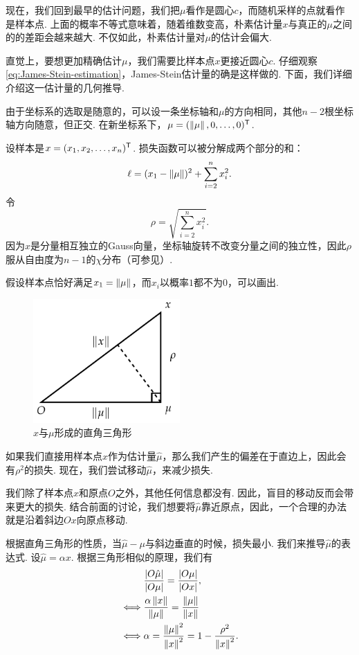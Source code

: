 现在，我们回到最早的估计问题，我们把$\mu$看作是圆心$c$，而随机采样的点就看作是样本点. 上面的概率不等式意味着，随着维数变高，朴素估计量$x$与真正的$\mu$之间的的差距会越来越大. 不仅如此，朴素估计量对$\mu$的估计会偏大. 

直觉上，要想更加精确估计$\mu$，我们需要比样本点$x$更接近圆心$c$. 仔细观察 \eqref{eq:James-Stein-estimation}，James-Stein估计量的确是这样做的. 下面，我们详细介绍这一估计量的几何推导. 

由于坐标系的选取是随意的，可以设一条坐标轴和$\mu$的方向相同，其他$n-2$根坐标轴方向随意，但正交. 在新坐标系下，$\mu = (\left\|\mu\right\|,0,\dots,0)^{\mathsf{T}}$. 

设样本是$x=(x_1,x_2,\dots,x_n)^{\mathsf{T}}$. 损失函数可以被分解成两个部分的和：
\begin{equation}
    \ell=(x_1-\left\|\mu\right\|)^2+\sum_{i=2}^nx_i^2. \label{eq:loss-decomposition}
\end{equation}
令
\[\rho = \sqrt{\sum_{i=2}^n x_i^2}.\]
因为$x$是分量相互独立的Gauss向量，坐标轴旋转不改变分量之间的独立性，因此$\rho$服从自由度为$n-1$的$\chi$分布（可参见）. 

假设样本点恰好满足$x_1=\left\|\mu\right\|$，而$x_i$以概率$1$都不为$0$，可以画出. 
\begin{figure}[ht]
    \centering
    \includegraphics[width=0.5\textwidth]{figures/J-L-lemma/triangle.pdf}
    \caption{$x$与$\mu$形成的直角三角形}
    \label{fig:triangle}
\end{figure}

如果我们直接用样本点$x$作为估计量$\hat\mu$，那么我们产生的偏差在于直边上，因此会有$\rho^2$的损失. 现在，我们尝试移动$\hat\mu$，来减少损失. 

我们除了样本点$x$和原点$O$之外，其他任何信息都没有. 因此，盲目的移动反而会带来更大的损失. 结合前面的讨论，我们想要将$\hat\mu$靠近原点，因此，一个合理的办法就是沿着斜边$Ox$向原点移动. 

根据直角三角形的性质，当$\hat\mu-\mu$与斜边垂直的时候，损失最小. 我们来推导$\hat\mu$的表达式. 设$\hat\mu=\alpha x$. 根据三角形相似的原理，我们有
\begin{align*}
    &\frac{|O\hat\mu|}{|O\mu|}= \frac{|O\mu|}{|Ox|},\\
    \iff&\frac{\alpha\left\|x\right\|}{\left\|\mu\right\|}=\frac{\left\|\mu\right\|}{\left\|x\right\|}\\
    \iff&\alpha = \frac{\left\|\mu\right\|^2}{\left\|x\right\|^2}=1-\frac{\rho^2}{\left\|x\right\|^2}.
\end{align*}

